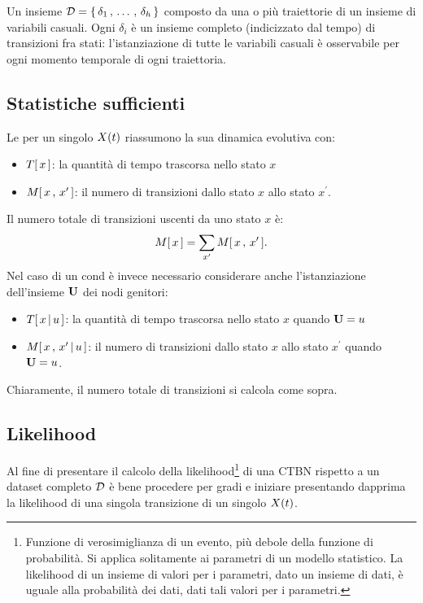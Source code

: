 \begin{definizione}
\label{defn:dataset-completo}
Un insieme $\mathcal{D}=\{\,\delta_1\,,\,\dotsc\,,\,\delta_h\,\}$ composto da una o più traiettorie di un insieme di variabili casuali. Ogni $\delta_i$ è un insieme completo (indicizzato dal tempo) di transizioni fra stati: l'istanziazione di tutte le variabili casuali è osservabile per ogni momento temporale di ogni traiettoria.
\end{definizione}

\subsection{Statistiche sufficienti}
\label{sec:ctbn-sufficient-stats}
Le \emph{\stats{}} per un singolo \mprocess*{} \omog*{} $\mathnormal{X}(t)$ riassumono la sua dinamica evolutiva con:
\begin{itemize}
    \item $T[\,x\,]$: la quantità di tempo trascorsa nello stato $x$
    \item $\mstat[x]{x^\prime}$: il numero di transizioni dallo stato $x$ allo stato $x^\prime$.
\end{itemize}

Il numero totale di transizioni uscenti da uno stato $x$ è:
\[
\mstat{x}=\sum_{x^\prime}\mstat[x]{x^\prime}\text{.}
\]
Nel caso di un \mprocess{}cond{} è invece necessario considerare anche l'istanziazione dell'insieme $\mathbf{U}$ dei nodi genitori:
\begin{itemize}
    \item $T[\,x\,\arrowvert\,u\,]$: la quantità di tempo trascorsa nello stato $x$ quando $\mathbf{U}=u$
    \item $\mstat[x]{x^\prime\,\arrowvert\,u}$: il numero di transizioni dallo stato $x$ allo stato $x^\prime$ quando $\mathbf{U}=u$.
\end{itemize}
Chiaramente, il numero totale di transizioni si calcola come sopra.

\subsection{Likelihood}
\label{sec:ctbn-likelihood}
Al fine di presentare il calcolo della likelihood\footnote{Funzione di verosimiglianza di un evento, più debole della funzione di probabilità. Si applica solitamente ai parametri di un modello statistico. La likelihood di un insieme di valori per i parametri, dato un insieme di dati, è uguale alla probabilità dei dati, dati tali valori per i parametri.} di una \acs{CTBN} rispetto a un dataset completo $\mathcal{D}$ è bene procedere per gradi e iniziare presentando dapprima la likelihood di una singola transizione di un singolo \mprocess{} \omog{} $\mathnormal{X}(t)$.

